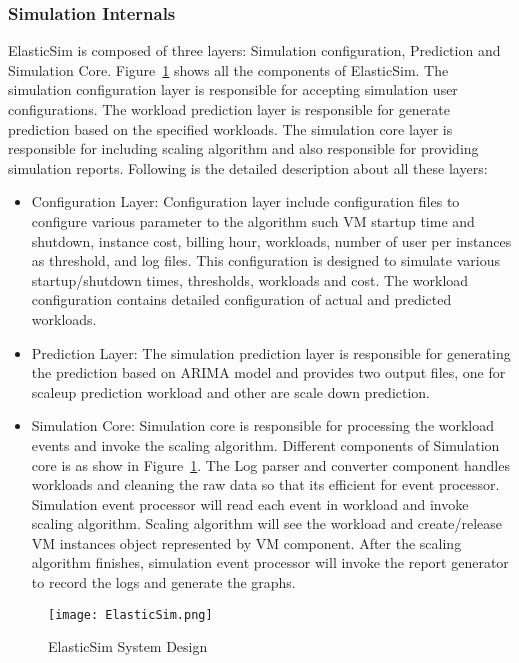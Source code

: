  \subsubsection{Simulation Internals}
 \label{subs:Simulation Internals}
 ElasticSim is composed of three layers: Simulation configuration, Prediction and Simulation Core. Figure~\ref{figure:elasticsim} shows all the components of ElasticSim. The simulation configuration layer is responsible for accepting simulation user configurations. The workload prediction layer is responsible for generate prediction based on the specified workloads. The simulation core layer is responsible for including scaling algorithm and also responsible for providing simulation reports. Following is the detailed description about all these layers:
 \begin{itemize}
 \item Configuration Layer: Configuration layer include configuration files to configure various parameter to the algorithm such VM startup time and shutdown, instance cost, billing hour, workloads, number of user per instances as threshold, and  log files. This configuration is designed to simulate various startup/shutdown times, thresholds, workloads and cost. The workload configuration contains detailed configuration of actual and predicted workloads.
 \item Prediction Layer: The simulation prediction layer is responsible for generating the prediction based on ARIMA model and provides two output files, one for scaleup prediction workload and other are scale down prediction.
 \item Simulation Core: Simulation core is responsible for processing the workload events and invoke the scaling algorithm.
 Different components of Simulation core is as show in Figure~\ref{figure:elasticsim}. The Log parser and converter component handles workloads and cleaning the raw data so that its efficient for event processor. Simulation event processor will read each event in workload and invoke scaling algorithm. Scaling algorithm will see the workload and create/release VM instances object represented by VM component. After the scaling algorithm finishes, simulation event processor will invoke the report generator to record the logs and generate the graphs.
 \end{itemize}
 \begin{figure}[h]
   \begin{center}
     \texttt{[image: ElasticSim.png]}
     \caption{ElasticSim System Design}
     \label{figure:elasticsim}
   \end{center}
 \end{figure}

